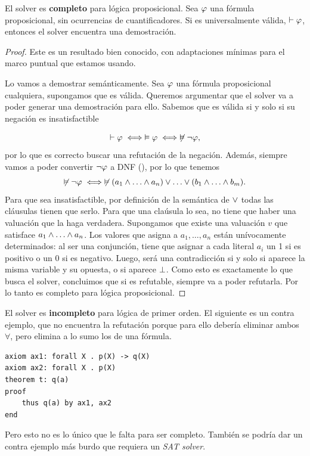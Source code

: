 \begin{theorem}
    El solver es \textbf{completo} para lógica proposicional. Sea $\varphi$ una fórmula proposicional, sin ocurrencias de cuantificadores. Si es universalmente válida, $\vdash \varphi$, entonces el solver encuentra una demostración.
\end{theorem}
\begin{proof}
Este es un resultado bien conocido, con adaptaciones mínimas para el marco puntual que estamos usando.

Lo vamos a demostrar semánticamente. Sea $\varphi$ una fórmula proposicional cualquiera, supongamos que es válida. Queremos argumentar que el solver va a poder generar una demostración para ello. Sabemos que es válida si y solo si su negación es insatisfactible

\[
    \vdash \varphi
    \iff 
    \vDash \varphi
    \iff
    \not\vDash \neg \varphi,
\]
por lo que es correcto buscar una refutación de la negación. Además, siempre vamos a poder convertir $\neg \varphi$ a DNF (), por lo que tenemos
\[
    \not\vDash\fNot \anyForm \iff
    \not\vDash (\formLit_1 \fAnd \dots \fAnd \formLit_n)
    \fOr \dots \fOr
    (\formLitTwo_1 \fAnd \dots \fAnd \formLitTwo_m).
\]
Para que sea insatisfactible, por definición de la semántica de $\vee$ todas las
cláusulas tienen que serlo. Para que una claúsula lo sea, no tiene que haber una
valuación que la haga verdadera. Supongamos que existe una valuación
$v$ que satisface $a_1 \fAnd \dots \fAnd a_n$. Los valores que asigna a $a_1, \dots, a_n$ están unívocamente determinados: al ser una conjunción, tiene
que asignar a cada literal $a_i$ un 1 si es positivo o un 0 si es negativo. Luego, será una contradicción si y solo si aparece la misma variable y su opuesta, o si aparece $\bot$. Como esto es exactamente lo que busca el solver, concluimos que si es refutable, siempre va a poder refutarla.
Por lo tanto es completo para lógica proposicional.

\end{proof}

\begin{obs*}
El solver es \textbf{incompleto} para lógica de primer orden.
El siguiente es un contra ejemplo, que no encuentra la refutación porque para
ello debería eliminar ambos $\forall$, pero elimina a lo sumo los de una
fórmula.
\begin{lstlisting}
axiom ax1: forall X . p(X) -> q(X)
axiom ax2: forall X . p(X)
theorem t: q(a)
proof
    thus q(a) by ax1, ax2
end
\end{lstlisting}

Pero esto no es lo único que le falta para ser completo. También se podría dar un contra ejemplo más burdo que requiera un \textit{SAT solver}.
\end{obs*}

